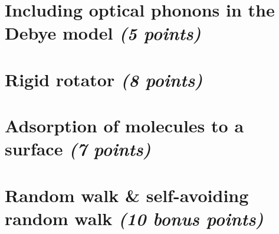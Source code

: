 \documentclass[11 pt]{article}
\begin{document}
    \section{
        Including optical phonons in the Debye model \textit{(5 points)}
    }
    
    \newpage

    \section{Rigid rotator \textit{(8 points)}}
    
    \newpage

    \section{Adsorption of molecules to a surface \textit{(7 points)}}
    
    \newpage

    \section{Random walk \& self-avoiding random walk 
        \textit{(10 bonus points)}
    }
    
\end{document}
